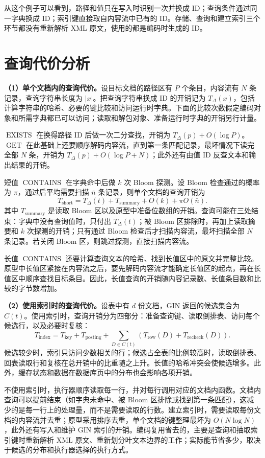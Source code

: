 从这个例子可以看到，路径和值只在写入时识别一次并换成 ID；查询条件通过同一字典换成 ID；索引键直接取自内容流中已有的 ID。存储、查询和建立索引三个环节都没有重新解析 XML 原文，使用的都是编码时生成的 ID。

\section{查询代价分析}
\textbf{（1）单个文档内的查询代价。}设目标文档的路径区有 $P$ 个条目，内容流有 $N$ 条记录，查询字符串长度为 $|x|$。把查询字符串换成 ID 的开销记为 $T_{\Delta}(x)$，包括计算字符串的哈希、必要的键比较和访问运行时字典。下面的比较次数假定编码对象和所需字典都已可以访问；读取和解包对象、准备运行时字典的开销另行计量。

$\operatorname{EXISTS}$ 在换得路径 ID 后做一次二分查找，开销为 $T_{\Delta}(p)+O(\log P)$。$\operatorname{GET}$ 在此基础上还要顺序解码内容流，直到第一条匹配记录，最坏情况下读完全部 $N$ 条，开销为 $T_{\Delta}(p)+O(\log P+N)$；此外还有由值 ID 反查文本和输出结果的开销。

短值 $\operatorname{CONTAINS}$ 在字典命中后做 $k$ 次 Bloom 探测。设 Bloom 检查通过的概率为 $\pi$，通过后平均需要扫描 $\bar n$ 条记录，则单个文档的查询开销为
\[
T_{\mathrm{short}}=T_{\Delta}(t)+T_{\mathrm{summary}}+O(k)+\pi O(\bar n).
\]
其中 $T_{\mathrm{summary}}$ 是读取 Bloom 区以及原型中准备位数组的开销。查询可能在三处结束：字典中没有查询值时，只付出 $T_{\Delta}(t)$；被 Bloom 区排除时，再加上读取摘要和 $k$ 次探测的开销；只有通过 Bloom 检查后才扫描内容流，最坏扫描全部 $N$ 条记录。若关闭 Bloom 区，则跳过探测，直接扫描内容流。

长值 $\operatorname{CONTAINS}$ 还要计算查询文本的哈希、找到长值区中的原文并完整比较。原型中长值区紧接在内容流之后，要先解码内容流才能确定长值区的起点，再在长值区中顺序查找目标条目。因此，长值查询的开销随内容记录数、长值条目数和比较的字节数增加。

\textbf{（2）使用索引时的查询代价。}设表中有 $d$ 份文档，GIN 返回的候选集合为 $C(t)$。使用索引时，查询开销分为四部分：准备查询键、读取倒排表、访问每个候选行，以及必要时复核：
\[
T_{\mathrm{index}}=T_{\mathrm{key}}+T_{\mathrm{posting}}
+\sum_{D\in C(t)}\left(T_{\mathrm{row}}(D)+T_{\mathrm{recheck}}(D)\right).
\]
候选较少时，索引只访问少数相关的行；候选占全表的比例较高时，读取倒排表、回表读取行和复核在总开销中的比重随之上升。长值的哈希冲突会使候选增多。此外，缓存状态和数据在数据库页中的分布也会影响各项开销。

不使用索引时，执行器顺序读取每一行，并对每行调用对应的文档内函数。文档内查询可以提前结束（如字典未命中、被 Bloom 区排除或找到第一条匹配），这减少的是每一行上的处理量，而不是需要读取的行数。建立索引时，需要读取每份文档的内容流并去重；原型采用排序去重，单个文档的键整理最坏为 $O(N\log N)$，此外还有写入和维护 GIN 索引的开销。编码复用省去的，主要是查询和抽取索引键时重新解析 XML 原文、重新划分叶文本边界的工作；实际能节省多少，取决于候选的分布和执行器选择的执行方式。

